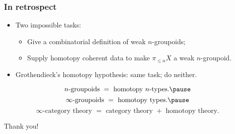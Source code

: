 \begin{frame}
	\frametitle{In retrospect}

	\begin{itemize}
		\item 
			Two impossible tasks:\pause
			\begin{itemize}
				\item 
					Give a \alert{combinatorial} definition of weak $n$-groupoids; \pause
				\item
					Supply homotopy coherent data to make $\pi_{\le n}X$ a weak $n$-groupoid.\pause
			\end{itemize}
		\item
			Grothendieck's homotopy hypothesis: same task\pause; do neither. \pause
	\end{itemize}

	\begin{slog}
	\[
		n\mbox{-groupoids } = \mbox{ homotopy } n \mbox{-types}. \pause
	\]
	\[
		\infty\mbox{-groupoids } = \mbox{ homotopy types}.\pause
	\]
	\[
		\infty\mbox{-category theory }=\mbox{ category theory }+\mbox{ homotopy theory}.
	\]
	\end{slog}



\end{frame}


\begin{frame}
	\huge Thank you!


\end{frame}



